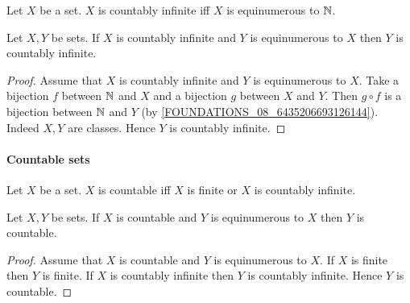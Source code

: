 \documentclass[../arithmetic.tex]{subfiles}
\begin{document}
  \begin{forthel}
    \begin{definition}
      Let $X$ be a set.
      $X$ is countably infinite iff $X$ is equinumerous to $\mathbb{N}$.
    \end{definition}
  \end{forthel}

  \begin{forthel}
    \begin{proposition}
      Let $X, Y$ be sets.
      If $X$ is countably infinite and $Y$ is equinumerous to $X$ then $Y$ is
      countably infinite.
    \end{proposition}
    \begin{proof}
      Assume that $X$ is countably infinite and $Y$ is equinumerous to $X$.
      Take a bijection $f$ between $\mathbb{N}$ and $X$ and a bijection $g$ between
      $X$ and $Y$.
      Then $g \circ f$ is a bijection between $\mathbb{N}$ and $Y$
      (by \cref{FOUNDATIONS_08_6435206693126144}).
      Indeed $X, Y$ are classes.
      Hence $Y$ is countably infinite.
    \end{proof}
  \end{forthel}


  \paragraph{Countable sets}

  \begin{forthel}
    \begin{definition}
      Let $X$ be a set.
      $X$ is countable iff $X$ is finite or $X$ is countably infinite.
    \end{definition}
  \end{forthel}

  \begin{forthel}
    \begin{proposition}
      Let $X, Y$ be sets.
      If $X$ is countable and $Y$ is equinumerous to $X$ then $Y$ is countable.
    \end{proposition}
    \begin{proof}
      Assume that $X$ is countable and $Y$ is equinumerous to $X$.
      If $X$ is finite then $Y$ is finite.
      If $X$ is countably infinite then $Y$ is countably infinite.
      Hence $Y$ is countable.
    \end{proof}
  \end{forthel}
\end{document}
